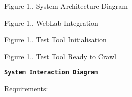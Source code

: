  \begin{center} Figure 1.. System Architecture Diagram \end{center} 

 \begin{center} Figure 1.. Web\+Lab Integration \end{center} 

 \begin{center} Figure 1.. Test Tool Initialisation \end{center} 

 \begin{center} Figure 1.. Test Tool Ready to Crawl \end{center} 

\href{CAT-D_140204ProcessDiagram-v1-3.pdf}{\tt {\bfseries System Interaction Diagram}}

Requirements\+:


